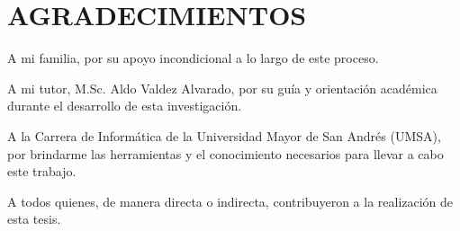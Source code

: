 \chapter*{AGRADECIMIENTOS}


A mi familia, por su apoyo incondicional a lo largo de este proceso.

A mi tutor, M.Sc. Aldo Valdez Alvarado, por su guía y orientación académica durante el desarrollo de esta investigación.

A la Carrera de Informática de la Universidad Mayor de San Andrés (UMSA), por brindarme las herramientas y el conocimiento necesarios para llevar a cabo este trabajo.

A todos quienes, de manera directa o indirecta, contribuyeron a la realización de esta tesis.
